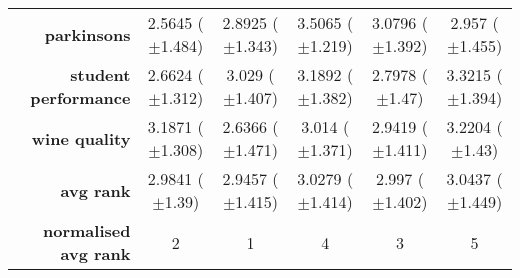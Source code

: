 \begin{table}[htbp]
{\begin{tabular}{r|ccccc}
			\textbf{parkinsons}          & \cellcolor[rgb]{ .388,  .745,  .482}2.5645 ($\pm$1.484) & \cellcolor[rgb]{ .898,  .89,  .51}2.8925 ($\pm$1.343)   & \cellcolor[rgb]{ .973,  .412,  .42}3.5065 ($\pm$1.219)  & \cellcolor[rgb]{ .996,  .808,  .498}3.0796 ($\pm$1.392) & \cellcolor[rgb]{ 1,  .922,  .518}2.957 ($\pm$1.455)     \\
			\textbf{student performance} & \cellcolor[rgb]{ .388,  .745,  .482}2.6624 ($\pm$1.312) & \cellcolor[rgb]{ 1,  .922,  .518}3.029 ($\pm$1.407)     & \cellcolor[rgb]{ .988,  .643,  .467}3.1892 ($\pm$1.382) & \cellcolor[rgb]{ .612,  .808,  .494}2.7978 ($\pm$1.47)  & \cellcolor[rgb]{ .973,  .412,  .42}3.3215 ($\pm$1.394)  \\
			\textbf{wine quality}        & \cellcolor[rgb]{ .98,  .494,  .439}3.1871 ($\pm$1.308)  & \cellcolor[rgb]{ .388,  .745,  .482}2.6366 ($\pm$1.471) & \cellcolor[rgb]{ 1,  .922,  .518}3.014 ($\pm$1.371)     & \cellcolor[rgb]{ .882,  .886,  .51}2.9419 ($\pm$1.411)  & \cellcolor[rgb]{ .973,  .412,  .42}3.2204 ($\pm$1.43)   \\
			\midrule
			\textbf{avg rank}            & \cellcolor[rgb]{ .843,  .875,  .506}2.9841 ($\pm$1.39)  & \cellcolor[rgb]{ .388,  .745,  .482}2.9457 ($\pm$1.415) & \cellcolor[rgb]{ .984,  .588,  .455}3.0279 ($\pm$1.414) & \cellcolor[rgb]{ 1,  .922,  .518}2.997 ($\pm$1.402)     & \cellcolor[rgb]{ .973,  .412,  .42}3.0437 ($\pm$1.449)  \\
			\midrule
			\textbf{normalised avg rank} & \cellcolor[rgb]{ .694,  .831,  .498}2                   & \cellcolor[rgb]{ .388,  .745,  .482}1                   & \cellcolor[rgb]{ .988,  .667,  .471}4                   & \cellcolor[rgb]{ 1,  .922,  .518}3                      & \cellcolor[rgb]{ .973,  .412,  .42}5                    \\
		\end{tabular}%

	}
\end{table}%

